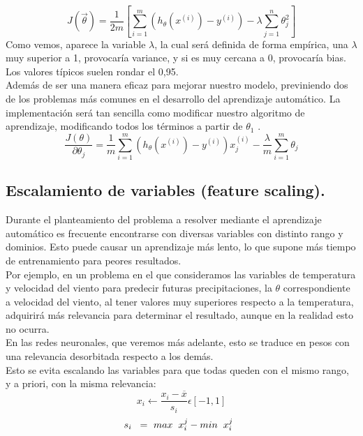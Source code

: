 \documentclass[a4paper,11pt]{article}
\begin{document}
\[
J(\vec{\theta})=\frac{1}{2m}\left[\sum_{i=1}^{m} \left(h_\theta (x^{(i)})-y^{(i)}\right)-\lambda \sum_{j=1}^{n}\theta_{j}^2\right]
\]
Como vemos, aparece la variable $\lambda$, la cual será definida de forma empírica, una $\lambda$ muy superior a 1, provocaría variance, y si es muy cercana a 0, provocaría bias. Los valores típicos suelen rondar el 0,95.\\

\noindent
Además de ser una manera eficaz para mejorar nuestro modelo, previniendo dos de los problemas más comunes en el desarrollo del aprendizaje automático. La implementación será tan sencilla como modificar nuestro algoritmo de aprendizaje, modificando todos los términos a partir de $\theta_1$ .\\
\[
\frac{J(\theta)}{\partial\theta_j} = \frac{1}{m} \sum_{i=1}^{m} \left(h_\theta (x^{(i)})-y^{(i)}\right) x_{j}^{(i)}-\frac{\lambda}{m} \sum_{i=1}^{m} \theta_j 
\]

\subsection{Escalamiento de variables (feature scaling).}

Durante el planteamiento del problema a resolver mediante el aprendizaje automático es frecuente encontrarse con diversas variables con distinto rango y dominios. Esto puede causar un aprendizaje más lento, lo que supone más tiempo de entrenamiento para peores resultados. \\

\noindent
Por ejemplo, en un problema en el que consideramos las variables de temperatura y velocidad del viento para predecir futuras precipitaciones, la $\theta$ correspondiente a  velocidad del viento, al tener valores muy superiores respecto a la temperatura, adquirirá más relevancia para determinar el resultado, aunque en la realidad esto no ocurra.\\ 

\noindent
En las redes neuronales, que veremos más adelante, esto se traduce en pesos con una relevancia desorbitada respecto a los demás.\\

\noindent
Esto se evita escalando las variables para que todas queden con el mismo rango, y a priori, con la misma relevancia:
\[
x_i \longleftarrow \frac{x_i - \overline{x}}{s_i} \epsilon [-1,1]
\]
\hspace{0.20cm}
\[
s_i \hspace{0.20cm} = \  max\hspace{0.20cm}x_{i}^j -min\hspace{0.20cm}x_{i}^j \hspace{0.20cm}
\]
\newpage
\end{document}
